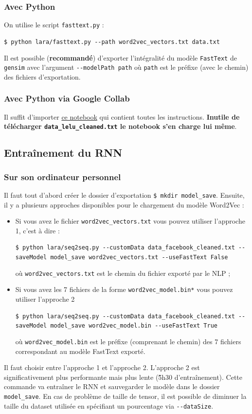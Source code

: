 \documentclass[10pt,a4paper]{article}
\begin{document}
\subsubsection{Avec Python}
On utilise le script \texttt{fasttext.py} :
\begin{center}
	\texttt{\$ python lara/fasttext.py -{}-path word2vec\_vectors.txt data.txt}
\end{center}
Il est possible (\textbf{recommandé}) d'exporter l’intégralité du modèle \texttt{FastText} de \texttt{gensim} avec l'argument \texttt{-{}-modelPath path} où \texttt{path} est le préfixe (avec le chemin) des fichiers d'exportation.

\subsubsection{Avec Python via Google Collab}
Il suffit d'importer \href{https://github.com/LaraProject/notebooks/blob/master/LaraProject_Word2Vec.ipynb}{ce notebook} qui contient toutes les instructions. \textbf{Inutile de télécharger \texttt{data\_lelu\_cleaned.txt} le notebook s'en charge lui même}.

\subsection{Entraînement du RNN}
\subsubsection{Sur son ordinateur personnel}
Il faut tout d'abord créer le dossier d'exportation \texttt{\$ mkdir model\_save}. Ensuite, il y a plusieurs approches disponibles pour le chargement du modèle Word2Vec :
\begin{itemize}
    \item Si vous avez le fichier \texttt{word2vec\_vectors.txt} vous pouvez utiliser l'approche 1, c'est à dire :
    \begin{center}
    	\texttt{\$ python lara/seq2seq.py -{}-customData data\_facebook\_cleaned.txt -{}-saveModel model\_save  word2vec\_vectors.txt -{}-useFastText False}
    \end{center}
    où \texttt{word2vec\_vectors.txt} est le chemin du fichier exporté par le NLP ;
    \item Si vous avez les 7 fichiers de la forme \texttt{word2vec\_model.bin*} vous pouvez utiliser l'approche 2
    \begin{center}
    	\texttt{\$ python lara/seq2seq.py -{}-customData data\_facebook\_cleaned.txt -{}-saveModel model\_save  word2vec\_model.bin -{}-useFastText True}
    \end{center}
    où \texttt{word2vec\_model.bin} est le préfixe (comprenant le chemin) des 7 fichiers correspondant au modèle FastText exporté.
\end{itemize}
Il faut choisir entre l'approche 1 et l'approche 2. L'approche 2 est significativement plus performante mais plus lente (\~5h30 d'entraînement). Cette commande va entraîner le RNN et sauvegarder le modèle dans le dossier \texttt{model\_save}. En cas de problème de taille de tensor, il est possible de diminuer la taille du dataset utilisée en spécifiant un pourcentage via \texttt{-{}-dataSize}.
\end{document}
